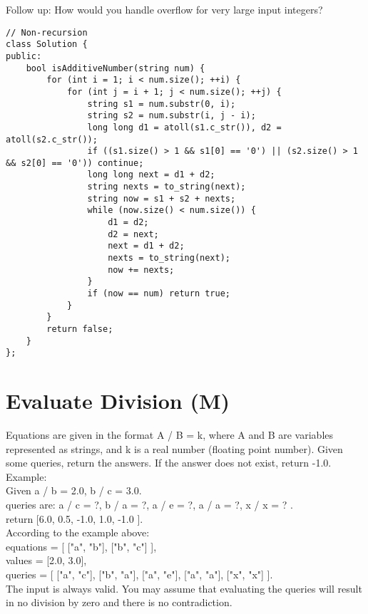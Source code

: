 Follow up:
How would you handle overflow for very large input integers? \\

\begin{lstlisting}
// Non-recursion
class Solution {
public:
    bool isAdditiveNumber(string num) {
        for (int i = 1; i < num.size(); ++i) {
            for (int j = i + 1; j < num.size(); ++j) {
                string s1 = num.substr(0, i);
                string s2 = num.substr(i, j - i);
                long long d1 = atoll(s1.c_str()), d2 = atoll(s2.c_str());
                if ((s1.size() > 1 && s1[0] == '0') || (s2.size() > 1 && s2[0] == '0')) continue;
                long long next = d1 + d2;
                string nexts = to_string(next);
                string now = s1 + s2 + nexts;
                while (now.size() < num.size()) {
                    d1 = d2;
                    d2 = next;
                    next = d1 + d2;
                    nexts = to_string(next);
                    now += nexts;
                }
                if (now == num) return true;
            }
        }
        return false;
    }
};
\end{lstlisting}


\section{Evaluate Division (M)}
Equations are given in the format A / B = k, where A and B are variables represented as strings, and k is a real number (floating point number). Given some queries, return the answers. If the answer does not exist, return -1.0.\\

Example:\\
Given a / b = 2.0, b / c = 3.0.\\
queries are: a / c = ?, b / a = ?, a / e = ?, a / a = ?, x / x = ? .\\
return [6.0, 0.5, -1.0, 1.0, -1.0 ].\\

According to the example above:\\
equations = [ ["a", "b"], ["b", "c"] ],\\
values = [2.0, 3.0],\\
queries = [ ["a", "c"], ["b", "a"], ["a", "e"], ["a", "a"], ["x", "x"] ]. \\

The input is always valid. You may assume that evaluating the queries will result in no division by zero and there is no contradiction. \\

